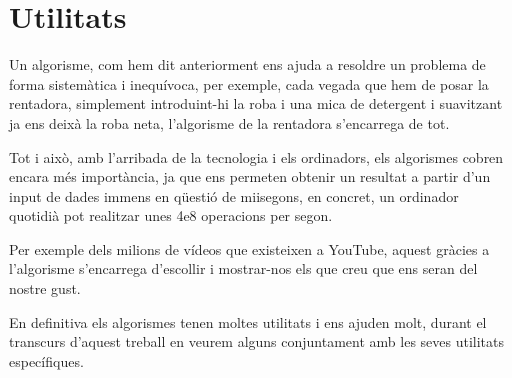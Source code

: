 \section{Utilitats}

Un algorisme, com hem dit anteriorment ens ajuda a resoldre un problema de forma sistemàtica i inequívoca, per exemple, cada vegada que hem de posar la rentadora, simplement introduint-hi la roba i una mica de detergent i suavitzant ja ens deixà la roba neta, l'algorisme de la rentadora s'encarrega de tot. \newline

Tot i això, amb l'arribada de la tecnologia i els ordinadors, els algorismes cobren encara més importància, ja que ens permeten obtenir un resultat a partir d'un input de dades immens en qüestió de mi\lgem isegons, en concret, un ordinador quotidià pot realitzar unes 4e8 operacions per segon. \newline

Per exemple dels milions de vídeos que existeixen a YouTube, aquest gràcies a l'algorisme s'encarrega d'escollir i mostrar-nos els que creu que ens seran del nostre gust. \newline

En definitiva els algorismes tenen moltes utilitats i ens ajuden molt, durant el transcurs d'aquest treball en veurem alguns conjuntament amb les seves utilitats específiques.